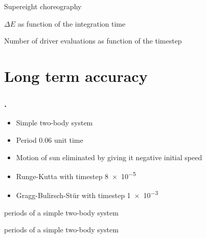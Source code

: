 \documentclass{beamer}
\begin{document}
\begin{frame}
\centering
Supereight choreography
\begin{figure}
	
\end{figure}	
\end{frame}


\begin{frame}
\centering
$\Delta E$ as function of the integration time
\vspace{-0.25cm}
\begin{figure}
	\centering
		
\end{figure}
\end{frame}


\begin{frame}
\centering
Number of driver evaluations as function of the timestep
\begin{figure}
	\centering
		
\end{figure}
\end{frame}

\section{Long term accuracy}
\begin{frame}
\frametitle{\thesection. \insertsection}
\begin{itemize}
	\item Simple two-body system
	\item Period \num{0.06} unit time
	\item Motion of sun eliminated by giving it negative initial speed
	\item Runge-Kutta with timestep \num{8e-5}
	\item Gragg-Bulirsch-Stür with timestep \num{1e-3}
\end{itemize}
\end{frame}

\begin{frame}
 periods of a simple two-body system
\begin{figure}
		
\end{figure}
\end{frame}


\begin{frame}
 periods of a simple two-body system
\begin{figure}
		
\end{figure}	
\end{frame}
\end{document}
